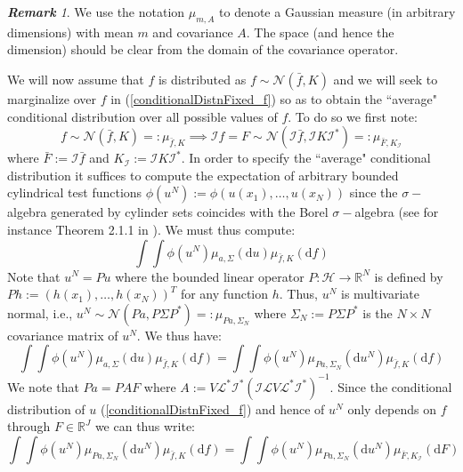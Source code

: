 \documentclass{article}
\theoremstyle{definition}
\theoremstyle{remark}
\newtheorem*{remark}{\textbf{Remark}}  %
\begin{document}
\begin{remark}
We use the notation $\mu_{m,A}$ to denote a Gaussian measure (in arbitrary dimensions) with mean $m$ and covariance $A$. The space (and hence the dimension) should be clear from the domain of the covariance operator.
\end{remark}

We will now assume that $f$ is distributed as $f\sim\mathcal{N}(\bar{f},K)$ and we will seek to marginalize over $f$ in (\ref{conditionalDistnFixed_f}) so as to obtain the ``average" conditional distribution over all possible values of $f$. To do so we first note:
\begin{equation}
    f\sim\mathcal{N}(\bar{f},K)=:\mu_{\bar{f},K} \implies \mathcal{I}f=F\sim\mathcal{N}(\mathcal{I}\bar{f},\mathcal{I}K\mathcal{I}^{*})=:\mu_{\bar{F},K_{\mathcal{I}}}
\end{equation}
where $\bar{F}:=\mathcal{I}\bar{f}$ and $K_{\mathcal{I}}:=\mathcal{I}K\mathcal{I}^{*}$. In order to specify the ``average" conditional distribution it suffices to compute the expectation of arbitrary bounded cylindrical test functions $\phi(u^{N}):=\phi(u(x_1),\dots,u(x_{N}))$ since the $\sigma-$algebra generated by cylinder sets coincides with the Borel $\sigma-$algebra (see for instance Theorem 2.1.1 in \cite{lunardi2015infinite}). We must thus compute:
\begin{equation}
    \int\int\phi(u^{N})\mu_{a,\Sigma}(\mathrm{d}u)\mu_{\bar{f},K}(\mathrm{d}f)
\end{equation}
Note that $u^{N}=Pu$ where the bounded linear operator $P:\mathcal{H}\rightarrow\mathbb{R}^{N}$ is defined by $Ph:=(h(x_1),\dots,h(x_N))^T$ for any function $h$. Thus, $u^{N}$ is multivariate normal, i.e., $u^{N}\sim\mathcal{N}(Pa,P\Sigma P^{*})=:\mu_{Pa,\Sigma_{N}}$ where $\Sigma_{N}:=P\Sigma P^{*}$ is the $N\times N$ covariance matrix of $u^{N}$. We thus have:
\begin{equation}
    \int\int\phi(u^{N})\mu_{a,\Sigma}(\mathrm{d}u)\mu_{\bar{f},K}(\mathrm{d}f) = \int\int\phi(u^{N})\mu_{Pa,\Sigma_N}(\mathrm{d}u^{N})\mu_{\bar{f},K}(\mathrm{d}f)
\end{equation}
We note that $Pa=PAF$ where $A:= V\mathcal{L}^{*}\mathcal{I}^{*}(\mathcal{I}\mathcal{L}V\mathcal{L}^{*}\mathcal{I}^{*})^{-1}$. Since the conditional distribution of $u$ (\ref{conditionalDistnFixed_f}) and hence of $u^{N}$ only depends on $f$ through $F\in\mathbb{R}^{J}$ we can thus write:
\begin{equation}
    \int\int\phi(u^{N})\mu_{Pa,\Sigma_N}(\mathrm{d}u^{N})\mu_{\bar{f},K}(\mathrm{d}f)=\int\int\phi(u^{N})\mu_{Pa,\Sigma_N}(\mathrm{d}u^{N})\mu_{\bar{F},K_{\mathcal{I}}}(\mathrm{d}F)
\end{equation}
\end{document}
